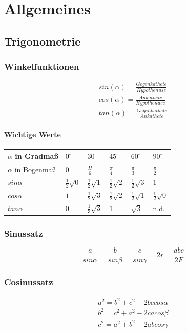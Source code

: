 \documentclass[12pt,a4paper]{article}%
\numberwithin{equation}{section}
\newcommand{\subsubsubsection}{\paragraph}
\numberwithin{equation}{subsection}
\begin{document}
\newpage

\section{Allgemeines}
	\subsection{Trigonometrie}
	  \subsubsection{Winkelfunktionen}
	  \begin{align}
	    sin(\alpha) = \frac{Gegenkathete}{Hypothenuse}\\
	    cos(\alpha) = \frac{Ankathete}{Hypothenuse}\\
	    tan(\alpha) = \frac{Gegenkathete}{Ankathete} \label{eq:trigo_Winkelf}
	  \end{align}
	  
	  \subsubsubsection{Wichtige Werte}
	  \renewcommand{\arraystretch}{1.5}
	  \begin{tabular}{|p{3.2cm}|p{1.8cm}|p{1.8cm}|p{1.8cm}|p{1.8cm}|p{1.8cm}|}\hline
		  $\alpha$ in Gradmaß & $0^{\circ}$ & $30^{\circ}$ & $45^{\circ}$ & $60^{\circ}$ & $90^{\circ}$ \\ \hline
		  $\alpha$ in Bogenmaß & $0$ & $\frac{\Pi}{6}$ & $\frac{\pi}{4}$ & $\frac{\pi}{3}$ & $\frac{\pi}{2}$ \\ \hline
		  $sin\alpha$ & $\frac{1}{2}\sqrt{0}$ & $\frac{1}{2}\sqrt{1}$ & $\frac{1}{2} \sqrt{2}$ & $\frac{1}{2}\sqrt{3}$ & $1$ \\ \hline
		  $cos\alpha$ & $1$ & $\frac{1}{2}\sqrt{3}$ & $\frac{1}{2}\sqrt{2}$ & $\frac{1}{2}\sqrt{1}$ & $\frac{1}{2}\sqrt{0}$ \\ \hline
		  $tan\alpha$ & $0$ & $\frac{1}{3}\sqrt{3}$ & $1$ & $\sqrt{3}$ & n.d. \\ \hline
	  \end{tabular}
	  \renewcommand{\arraystretch}{1}
	  
	  \subsubsection{Sinussatz}
	  \begin{equation}
	    \frac{a}{sin\alpha} = \frac{b}{sin\beta} = \frac{c}{sin\gamma} = 2r = \frac{abc}{2F} \label{eq:allg_sinussatz}  
	  \end{equation}
	  
	  \subsubsection{Cosinussatz}
	  \begin{align}   
	    a^2 = b^2 + c^2 - 2bc cos\alpha\\
	    b^2 = c^2 + a^2 - 2ca cos\beta\\
	    c^2 = a^2 + b^2 - 2ab cos\gamma \label{eq:trigo_cosinussatz}
	  \end{align}
	  
\end{document}
